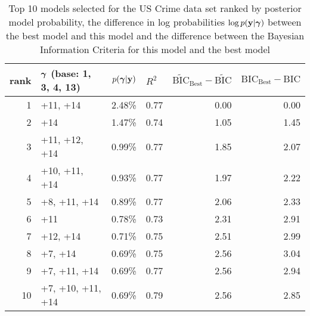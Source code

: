 \begin{table}
	\label{tab:numerical_results_uscrime}
	\caption{Top 10 models selected for the US Crime data set ranked by posterior model probability, the
		difference in log probabilities $\log p({\bf y}|{\boldsymbol \gamma})$ between the best model and this model and the difference between the Bayesian Information Criteria for this model and the best model}
	\begin{center}
		\begin{tabular}{r|l|r|l|r|r}
			rank & ${\boldsymbol \gamma}$ (base: 1, 3, 4, 13)& $p({\boldsymbol \gamma}|{\bf y})$ & $R^2$ & $\widetilde{\text{BIC}}_\text{Best} - \widetilde{\text{BIC}}$ & $\text{BIC}_\text{Best} - \text{BIC}$ \\
			\hline
			1 &  +11, +14&  2.48\%&  0.77&  0.00&  0.00\\
			2 & +14&  1.47\%&  0.74&  1.05&  1.45\\
			3 & +11, +12, +14&  0.99\%&  0.77&  1.85&  2.07\\
			4 & +10, +11, +14&  0.93\%&  0.77&  1.97&  2.22\\
			5 &  +8, +11, +14&  0.89\%&  0.77&  2.06&  2.33\\
			6 &  +11&  0.78\%&  0.73&  2.31&  2.91\\
			7 &  +12, +14&  0.71\%&  0.75&  2.51&  2.99\\
			8 &  +7, +14&  0.69\%&  0.75&  2.56&  3.04\\
			9 &  +7, +11, +14&  0.69\%&  0.77&  2.56&  2.94\\
			10 &  +7, +10, +11, +14&  0.69\%&  0.79&  2.56&  2.85\\
		\end{tabular}
	\end{center}
\end{table}
